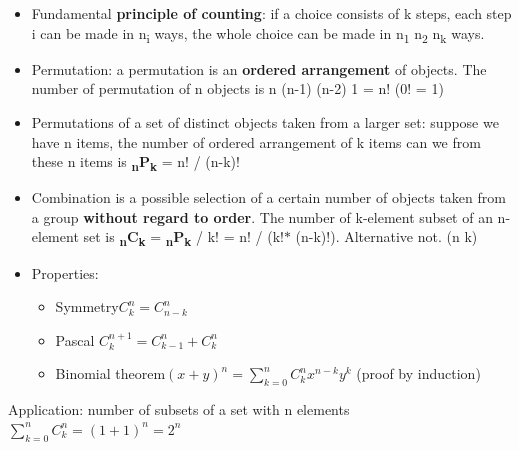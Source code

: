 \documentclass[12pt]{report}
\renewcommand{\_}{\kern-1.5pt\textunderscore\kern-1.5pt}
\begin{document}
\begin{itemize}
	\item Fundamental \textbf{principle of counting}: if a choice consists of k steps, each step i can be made in n\textsubscript{i} ways, the whole choice can be made in n\textsubscript{1}  n\textsubscript{2}  n\textsubscript{k} ways.\par

	\item Permutation: a permutation is an\textbf{ ordered arrangement} of objects. The number of permutation of n objects is n  (n-1)  (n-2)  1 = n! (0! = 1)\par

	\item Permutations of a set of distinct objects taken from a larger set: suppose we have n items, the number of ordered arrangement of k items can we from these n items is \textbf{\textsubscript{n}P\textsubscript{k}} = n! / (n-k)!  \par

	\item Combination is a possible selection of a certain number of objects taken from a group \textbf{without regard to order}. The number of k-element subset of an n-element set is \textbf{\textsubscript{n}C\textsubscript{k}} = \textbf{\textsubscript{n}P\textsubscript{k}} / k! = n! / (k!$\ast$ (n-k)!). Alternative not. (n k)\par

	\item Properties:\par

\begin{itemize}
	\item Symmetry\tab \tab  \( C_{k}^{n}=C_{n-k}^{n} \) \par

	\item Pascal \tab \tab \tab  \( C_{k}^{n+1}=C_{k-1}^{n}+C_{k}^{n} \) \par

	\item Binomial theorem\tab  \(  \left( x+y \right) ^{n}= \sum _{k=0}^{n}C_{k}^{n}x^{n-k}y^{k} \)  (proof by induction)
\end{itemize}
\end{itemize}\par

\begin{adjustwidth}{1.0in}{0.0in}
Application: number of subsets of a set with n elements  \(  \sum _{k=0}^{n}C_{k}^{n}= \left( 1+1 \right) ^{n}=2^{n} \) \par

\end{adjustwidth}
\end{document}
